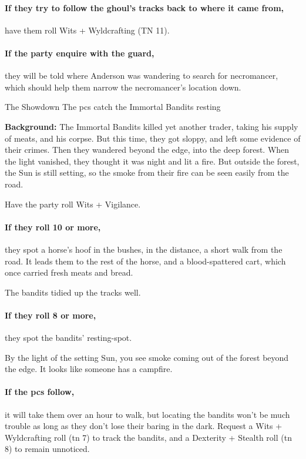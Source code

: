 
\paragraph{If they try to follow the ghoul's tracks back to where it came from,}
have them roll Wits + Wyldcrafting (TN 11).

\paragraph{If the party enquire with the \gls{guard},}
they will be told where Anderson was wandering to search for \gls{necromancer}, which should help them narrow the necromancer's location down.

{The Showdown}%
{The \glspl{pc} catch the Immortal Bandits resting}%

\textbf{Background:}
The Immortal Bandits killed yet another trader, taking his supply of meats, and his corpse.
But this time, they got sloppy, and left some evidence of their crimes.
Then they wandered beyond the \gls{edge}, into the deep forest.
When the light vanished, they thought it was night and lit a fire.
But outside the forest, the Sun is still setting, so the smoke from their fire can be seen easily from the road.

Have the party roll Wits + Vigilance.

\paragraph{If they roll 10 or more,}
they spot a horse's hoof in the bushes, in the distance, a short walk from the road.
It leads them to the rest of the horse, and a blood-spattered cart, which once carried fresh meats and bread.

The bandits tidied up the tracks well.

\paragraph{If they roll 8 or more,}
they spot the bandits' resting-spot.

\begin{boxtext}
  By the light of the setting Sun, you see smoke coming out of the forest beyond the \gls{edge}.
  It looks like someone has a campfire.
\end{boxtext}

\paragraph{If the \glspl{pc} follow,}
it will take them over an hour to walk, but locating the bandits won't be much trouble as long as they don't lose their baring in the dark.
Request a Wits + Wyldcrafting roll (\gls{tn} 7) to track the bandits, and a Dexterity + Stealth roll (\gls{tn} 8) to remain unnoticed.

